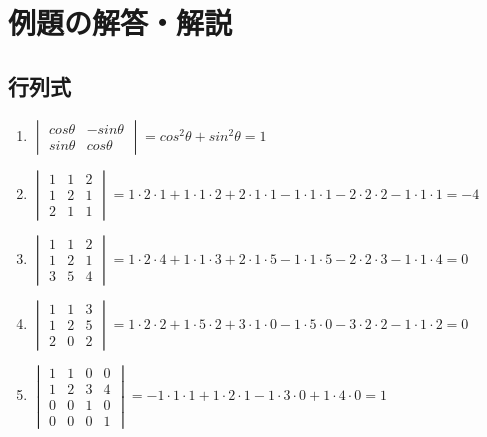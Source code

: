 \documentclass[10pt]{ujarticle}
\begin{document}
\section{例題の解答・解説}
\hypertarget{q1}{\subsection{行列式}}
\begin{enumerate}
  \item $\begin{vmatrix} cos\theta & -sin\theta\\ sin\theta & cos\theta \end{vmatrix}=cos^2\theta +sin^2\theta=1$
  \item $\begin{vmatrix} 1 & 1 & 2 \\ 1 & 2 & 1 \\ 2 & 1 & 1 \end{vmatrix}=1\cdot 2\cdot 1+1\cdot 1\cdot 2+2\cdot 1\cdot 1-1\cdot 1\cdot 1-2\cdot 2\cdot 2-1\cdot 1\cdot 1=-4$
  \item $\begin{vmatrix} 1 & 1 & 2 \\ 1 & 2 & 1 \\ 3 & 5 & 4 \end{vmatrix}=1\cdot 2\cdot 4+1\cdot 1\cdot 3+2\cdot 1\cdot 5-1\cdot 1\cdot 5-2\cdot 2\cdot 3-1\cdot 1\cdot 4=0$
  \item $\begin{vmatrix} 1 & 1 & 3 \\ 1 & 2 & 5 \\ 2 & 0 & 2 \end{vmatrix}=1\cdot 2\cdot 2+1\cdot 5\cdot 2+3\cdot 1\cdot 0-1\cdot 5\cdot 0-3\cdot 2\cdot 2-1\cdot 1\cdot 2=0$
  \item $\begin{vmatrix} 1 & 1 & 0 & 0 \\ 1 & 2 & 3 & 4 \\ 0 & 0 & 1 & 0 \\ 0 & 0 & 0 & 1\end{vmatrix}=-1\cdot1\cdot1+1\cdot2\cdot1-1\cdot3\cdot0+1\cdot4\cdot0=1$
\end{enumerate}
\end{document}
